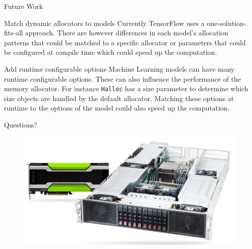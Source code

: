 \documentclass[10pt]{beamer}
\begin{document}




\begin{frame}[fragile]{Future Work}


\begin{alertblock}{Match dynamic allocators to models}
Currently TensorFlow uses a one-solution-fits-all approach. There are however differences in each model's allocation patterns that could be matched to a specific allocator or parameters that could be configured at compile time which could speed up the computation.
\end{alertblock}

\begin{alertblock}{Add runtime configurable options}
Machine Learning models can have many runtime configurable options. These can also influence the performance of the memory allocator. For instance \texttt{Halloc} has a size parameter to determine which size objects are handled by the default allocator. Matching these options at runtime to the options of the model could also speed up the computation.
\end{alertblock}

\end{frame}

\begin{frame}[fragile]{Questions?}

\begin{figure}
  \centering
    \includegraphics[width=\textwidth]{images/gpx.png}
\end{figure}

\end{frame}
\end{document}
